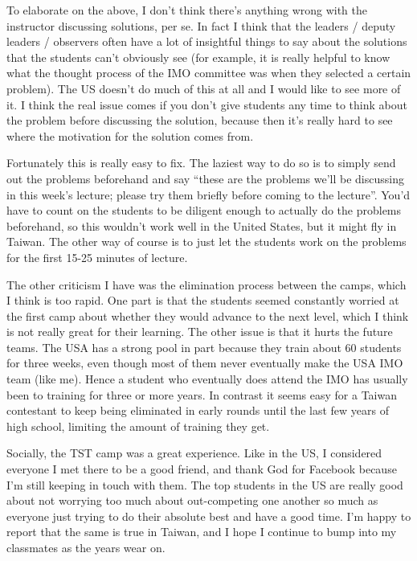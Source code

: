 \documentclass[11pt]{scrreprt}
\begin{document}
To elaborate on the above, I don't think there's anything wrong with the instructor discussing solutions,
per se. In fact I think that the leaders / deputy leaders / observers often have
a lot of insightful things to say about the solutions that the students can't obviously see (for example,
it is really helpful to know what the thought process of the IMO committee was
when they selected a certain problem).
The US doesn't do much of this at all and I would like to see more of it.
I think the real issue comes if you don't give students any time to think about
the problem before discussing the solution,
because then it's really hard to see where the motivation for the solution comes from.

Fortunately this is really easy to fix.
The laziest way to do so is to simply send out the problems beforehand and say
``these are the problems we'll be discussing in this week's lecture;
please try them briefly before coming to the lecture''.
You'd have to count on the students to be diligent enough to actually do the problems beforehand,
so this wouldn't work well in the United States, but it might fly in Taiwan.
The other way of course is to just let the students work on the problems for the
first 15-25 minutes of lecture.

The other criticism I have was the elimination process between the camps, which I think is too rapid.
One part is that the students seemed constantly worried at the first camp about
whether they would advance to the next level, which I think is not really great for their learning.
The other issue is that it hurts the future teams.
The USA has a strong pool in part because they train about 60 students for three weeks,
even though most of them never eventually make the USA IMO team (like me).
Hence a student who eventually does attend the IMO has usually been to training for three or more years.
In contrast it seems easy for a Taiwan contestant to keep being eliminated in
early rounds until the last few years of high school, limiting the amount of training they get.

Socially, the TST camp was a great experience.
Like in the US, I considered everyone I met there to be a good friend,
and thank God for Facebook because I'm still keeping in touch with them.
The top students in the US are really good about not worrying too much about
out-competing one another so much as everyone just trying to do their absolute best and have a good time.
I'm happy to report that the same is true in Taiwan,
and I hope I continue to bump into my classmates as the years wear on.
\end{document}
